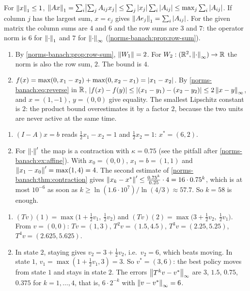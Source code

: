 For $\left\|x\right\|_1\leq1$,
$\left\|Ax\right\|_1 = \sum_i\bigl|\sum_jA_{ij}x_j\bigr|
\leq\sum_j\left|x_j\right|\sum_i\left|A_{ij}\right|\leq\max_j\sum_i\left|A_{ij}\right|$. If
column $j$ has the largest sum, $x = e_j$ gives
$\left\|Ae_j\right\|_1 = \sum_i\left|A_{ij}\right|$. For the given matrix the column sums
are $4$ and $6$ and the row sums are $3$ and $7$: the operator norm is $6$
for $\left\|\cdot\right\|_1$ and $7$ for $\left\|\cdot\right\|_\infty$
(\cref{norms-banach:prop:row-sum}).

\begin{enumerate}[nosep]
  \item By \cref{norms-banach:prop:row-sum}, $\left\|W_1\right\| = 2$. For
        $W_2:(\mathbb{R}^2, \left\|\cdot\right\|_\infty)\to\mathbb{R}$ the norm is also the row sum,
        $2$. The bound is $4$.
  \item $f(x) = \max(0, x_1 - x_2) + \max(0, x_2 - x_1) = \left|x_1 - x_2\right|$.
        By \eqref{norms-banach:eq:reverse} in $\mathbb{R}$,
        $\left|f(x) - f(y)\right|\leq\left|(x_1 - y_1) - (x_2 - y_2)\right|
        \leq2\left\|x - y\right\|_\infty$, and $x = (1, -1)$, $y = (0, 0)$ give
        equality. The smallest Lipschitz constant is $2$: the product
        bound overestimates it by a factor $2$, because the two units are
        never active at the same time.
\end{enumerate}

\begin{enumerate}[nosep]
  \item $(I - A)x = b$ reads $\frac12x_1 - x_2 = 1$ and $\frac12x_2 = 1$:
        $x^* = (6, 2)$.
  \item For $\left\|\cdot\right\|'$ the map is a contraction with $\kappa = 0.75$
        (see the pitfall after \cref{norms-banach:ex:affine}). With
        $x_0 = (0, 0)$, $x_1 = b = (1, 1)$ and
        $\left\|x_1 - x_0\right\|' = \max(1, 4) = 4$. The second estimate of
        \cref{norms-banach:thm:contraction} gives
        $\left\|x_k - x^*\right\|'\leq\frac{0.75^k}{0.25}\cdot4 = 16\cdot0.75^k$,
        which is at most $10^{-6}$ as soon as
        $k\geq\ln(1.6\cdot10^7)/\ln(4/3)\approx57.7$. So $k = 58$ is
        enough.
\end{enumerate}

\begin{enumerate}[nosep]
  \item $(Tv)(1) = \max\bigl(1 + \frac12v_1,\ \frac12v_2\bigr)$ and
        $(Tv)(2) = \max\bigl(3 + \frac12v_2,\ \frac12v_1\bigr)$. From
        $v = (0, 0)$: $Tv = (1, 3)$, $T^2v = (1.5, 4.5)$,
        $T^3v = (2.25, 5.25)$, $T^4v = (2.625, 5.625)$.
  \item In state $2$, staying gives $v_2 = 3 + \frac12v_2$, i.e.\
        $v_2 = 6$, which beats moving. In state $1$,
        $v_1 = \max(1 + \frac12v_1, 3) = 3$. So $v^* = (3, 6)$: the best
        policy moves from state $1$ and stays in state $2$. The errors
        $\left\|T^kv - v^*\right\|_\infty$ are $3$, $1.5$, $0.75$, $0.375$ for
        $k = 1,\dots,4$, that is, $6\cdot2^{-k}$ with
        $\left\|v - v^*\right\|_\infty = 6$.
\end{enumerate}

